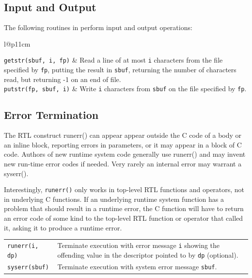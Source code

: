 \subsection{Input and Output}

The following routines in  perform input and output
operations:

\begin{xtabular}{l@{\hspace{1cm}}p{11cm}}

\texttt{getstr(sbuf, i, fp)} &
Read a line of at most \texttt{i} characters from the file specified by
\texttt{fp}, putting the result in \texttt{sbuf}, returning the number of
characters read, but returning -1 on an end of file.\\

\texttt{putstr(fp, sbuf, i)} &
Write \texttt{i} characters from \texttt{sbuf} on the file specified by \texttt{fp}.\\

\end{xtabular}

\subsection{Error Termination}

The RTL construct runerr() can appear appear outside the C code of a
body or an inline block, reporting errors in parameters, or it may
appear in a block of C code. Authors of new runtime system code
generally use runerr() and may invent new run-time error codes if
needed. Very rarely an internal error may warrant a syserr().

Interestingly, \texttt{runerr()} only works in top-level RTL functions
and operators, not in underlying C functions. If an underlying runtime
system function has a problem
that should result in a runtime error, the C function will have to
return an error code of some kind to the top-level RTL function or
operator that called it, asking it to produce a runtime error.

\begin{tabular}{l@{\hspace{1cm}}p{11cm}}

\texttt{runerr(i, dp)} &
Terminate execution with error message \texttt{i} showing the offending value in
the descriptor pointed to by \texttt{dp} (optional).
\\

\texttt{syserr(sbuf)} &
Terminate execution with system error message \texttt{sbuf}.\\

\end{tabular}

